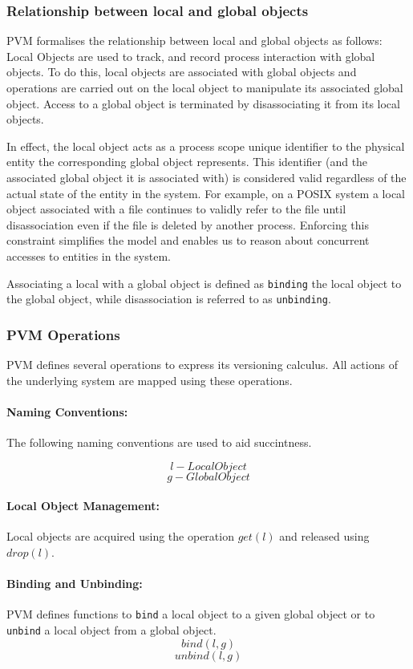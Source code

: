 \documentclass[withindex,glossary]{cam-thesis}
\begin{document}
\subsubsection{Relationship between local and global objects}
PVM formalises the relationship between local and global objects as follows:
Local Objects are used to track, and record process interaction with global objects.
To do this, local objects are associated with global objects and operations are carried out on the local object to manipulate its associated global object.
Access to a global object is terminated by disassociating it from its local objects.

In effect, the local object acts as a process scope unique identifier to the physical entity the corresponding global object represents.
This identifier (and the associated global object it is associated with) is considered valid regardless of the actual state of the entity in the system.
For example, on a POSIX system a local object associated with a file continues to validly refer to the file until disassociation even if the file is deleted by another process.
Enforcing this constraint simplifies the model and enables us to reason about concurrent accesses to entities in the system.

Associating a local with a global object is defined as \texttt{binding} the local object to the global object, while disassociation is referred to as \texttt{unbinding}.

\subsubsection{PVM Operations}
PVM defines several operations to express its versioning calculus. All actions of the underlying system are mapped using these operations.

\paragraph{Naming Conventions:}
The following naming conventions are used to aid succintness.

$$l - Local Object$$
$$g - Global Object$$

\paragraph{Local Object Management:}
Local objects are acquired using the operation $get(l)$ and released using $drop(l)$.

\paragraph{Binding and Unbinding:}
PVM defines functions to \texttt{bind} a local object to a given global object or to \texttt{unbind} a local object from a global object.
$$bind(l, g)$$
$$unbind(l, g)$$
\end{document}
